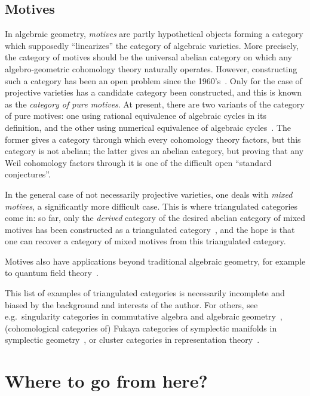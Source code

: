 \documentclass{amsproc}
\theoremstyle{definition}
\begin{document}
\subsection{Motives}
\label{motives}

In algebraic geometry, \emph{motives} are partly hypothetical objects forming a category which supposedly ``linearizes'' the category of algebraic varieties. More precisely, the category of motives should be the universal abelian category on which any algebro-geometric cohomology theory naturally operates. However, constructing such a category has been an open problem since the 1960's~\cite{Grothendieck}. Only for the case of projective varieties has a candidate category been constructed, and this is known as the \emph{category of pure motives}. At present, there are two variants of the category of pure motives: one using rational equivalence of algebraic cycles in its definition, and the other using numerical equivalence of algebraic cycles~\cite{Milne}. The former gives a category through which every cohomology theory factors, but this category is not abelian; the latter gives an abelian category, but proving that any Weil cohomology factors through it is one of the difficult open ``standard conjectures''.

In the general case of not necessarily projective varieties, one deals with \emph{mixed motives}, a significantly more difficult case. This is where triangulated categories come in: so far, only the \emph{derived} category of the desired abelian category of mixed motives has been constructed as a triangulated category~\cite{VSF}, and the hope is that one can recover a category of mixed motives from this triangulated category.

Motives also have applications beyond traditional algebraic geometry, for example to quantum field theory~\cite{Marcolli}.

\bigskip

This list of examples of triangulated categories is necessarily incomplete and biased by the background and interests of the author. For others, see e.g.~singularity categories in commutative algebra and algebraic geometry~\cite{Orlov}, (cohomological categories of) Fukaya categories of symplectic manifolds in symplectic geometry~\cite{Auroux}, or cluster categories in representation theory~\cite[3.2]{Keller}.

\section{Where to go from here?}
\end{document}
